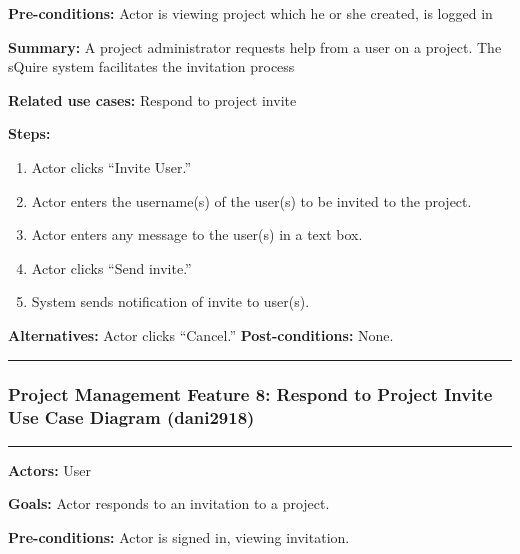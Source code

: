 \documentclass[twoside,letterpaper]{article}
\begin{document}
\noindent  \textbf{Pre-conditions:} Actor is viewing project which he or she created, is logged in   \newline

\noindent \textbf{Summary:} A project administrator requests help from a user on a project. The sQuire system facilitates the invitation process  \newline

\noindent \textbf{Related use cases:} Respond to project invite\newline

\noindent \textbf{Steps:} \begin{enumerate}
  \item Actor clicks ``Invite User.''
  \item Actor enters the username(s) of the user(s) to be invited to the project.
  \item Actor enters any message to the user(s) in a text box.
  \item Actor clicks ``Send invite.''
  \item System sends notification of invite to user(s).
 \end{enumerate}
 
\noindent  \textbf{Alternatives:} Actor clicks ``Cancel.''
 \textbf{Post-conditions:} None.  \newline
 
\vspace{8pt}
\hrule
\newpage



\subsubsection[Project Management Feature 8: Respond to Project Invite Use Case Diagram (dani2918)]{\rmfamily\bfseries\color{black}
	Project Management Feature 8: Respond to Project Invite Use Case Diagram (dani2918)}
\hypertarget{RefHeading22059017292}{}
\bigskip

\vspace{2pt}
\hrule
\vspace{8pt}
\noindent \textbf{Actors:} User  \newline

\noindent \textbf{Goals:} Actor responds to an invitation to a project.\newline

\noindent  \textbf{Pre-conditions:} Actor is signed in, viewing invitation.  \newline
\end{document}
